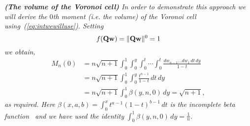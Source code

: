 \documentclass[journal]{IEEEtran}
\begin{document}
\begin{example}\emph{\textbf{(The volume of the Voronoi cell)}
In order to demonstrate this approach we will derive the $0$th moment (i.e. the volume) of the Voronoi cell using~(\ref{eq:intwewilluse}).  Setting 
\[
f(\mathbf{Q}\mathbf{w}) = \|\mathbf{Q}\mathbf{w}\|^0 = 1
\] 
we obtain,
\begin{align*}
M_n(0) &= n\sqrt{n+1} \int^{1}_{0} \int^{y}_{0} \int^{t}_{0} \cdots \int^{t}_{0} \frac{dw_{n-1}\dots dw_1 \, dt  \, dy}{1 - t}\\
 &= n\sqrt{n+1} \int_{0}^{1} \int^{y}_{0} \frac{t^{n-1}}{1 - t} \, dt  \, dy \\
&= n\sqrt{n+1}  \int^{1}_{0} \beta(y, n, 0) \, dy = \sqrt{n+1},
\end{align*}
as required.  Here $\beta(x,a,b) =  \int_{0}^{x}  t^{a-1}(1 - t)^{b-1} \,dt$ is the incomplete beta function~\cite{Pearson_tables_of_beta_functions} and we have used the identity $\int^{1}_{0} \beta(y, n, 0) \, dy = \frac{1}{n}$.}
\end{example}

\end{document}
